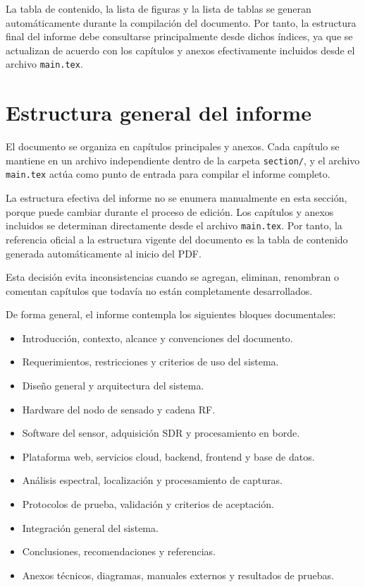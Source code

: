 La tabla de contenido, la lista de figuras y la lista de tablas se generan automáticamente durante la compilación del documento. Por tanto, la estructura final del informe debe consultarse principalmente desde dichos índices, ya que se actualizan de acuerdo con los capítulos y anexos efectivamente incluidos desde el archivo \texttt{main.tex}.

\section{Estructura general del informe}

El documento se organiza en capítulos principales y anexos. Cada capítulo se mantiene en un archivo independiente dentro de la carpeta \texttt{section/}, y el archivo \texttt{main.tex} actúa como punto de entrada para compilar el informe completo.

La estructura efectiva del informe no se enumera manualmente en esta sección, porque puede cambiar durante el proceso de edición. Los capítulos y anexos incluidos se determinan directamente desde el archivo \texttt{main.tex}. Por tanto, la referencia oficial a la estructura vigente del documento es la tabla de contenido generada automáticamente al inicio del PDF.

Esta decisión evita inconsistencias cuando se agregan, eliminan, renombran o comentan capítulos que todavía no están completamente desarrollados.

De forma general, el informe contempla los siguientes bloques documentales:

\begin{itemize}[leftmargin=*]
    \item Introducción, contexto, alcance y convenciones del documento.
    \item Requerimientos, restricciones y criterios de uso del sistema.
    \item Diseño general y arquitectura del sistema.
    \item Hardware del nodo de sensado y cadena RF.
    \item Software del sensor, adquisición SDR y procesamiento en borde.
    \item Plataforma web, servicios cloud, backend, frontend y base de datos.
    \item Análisis espectral, localización y procesamiento de capturas.
    \item Protocolos de prueba, validación y criterios de aceptación.
    \item Integración general del sistema.
    \item Conclusiones, recomendaciones y referencias.
    \item Anexos técnicos, diagramas, manuales externos y resultados de pruebas.
\end{itemize}


